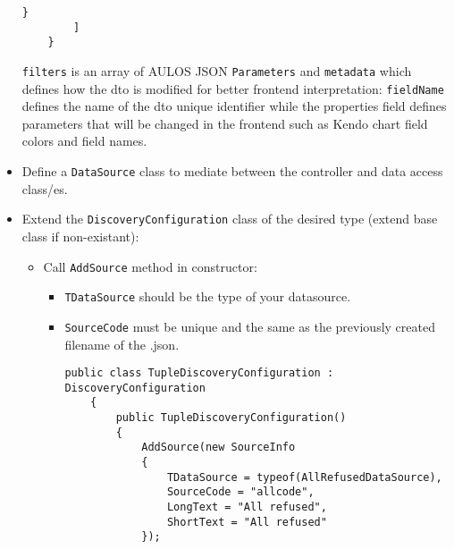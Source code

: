 \begin{itemize}
\begin{lstlisting}[caption={{sourcecode}.json example}, style=javaScriptCode]
            }   
        ]
    }
    \end{lstlisting}
    \verb|filters| is an array of AULOS JSON \verb|Parameters| and \verb|metadata| which defines how the dto is modified for better frontend interpretation: \verb|fieldName| defines the name of the dto unique identifier while the properties field defines parameters that will be changed in the frontend such as Kendo chart field colors and field names.
    \item Define a \verb|DataSource| class to mediate between the controller and data access class/es.
    \item Extend the \verb|DiscoveryConfiguration| class of the desired type (extend base class if non-existant):
    \begin{itemize}
        \item Call \verb|AddSource| method in constructor:
        \begin{itemize}
            \item \verb|TDataSource| should be the type of your datasource.
            \item \verb|SourceCode| must be unique and the same as the previously created filename of the .json.
            \begin{lstlisting}[caption={TupleDiscoveryConfiguration example}, style=javaScriptCode]
public class TupleDiscoveryConfiguration : DiscoveryConfiguration
    {
        public TupleDiscoveryConfiguration()
        {
            AddSource(new SourceInfo
            {
                TDataSource = typeof(AllRefusedDataSource),
                SourceCode = "allcode",
                LongText = "All refused",
                ShortText = "All refused"
            });


\end{lstlisting}
\end{itemize}
\end{itemize}
\end{itemize}
